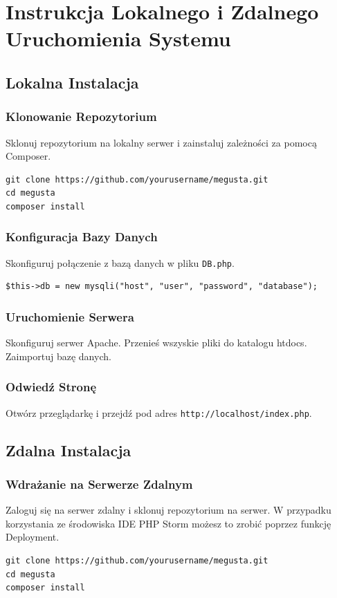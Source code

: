\documentclass[a4paper,12pt]{report}
\begin{document}
\chapter{Instrukcja Lokalnego i Zdalnego Uruchomienia Systemu}

\section{Lokalna Instalacja}

\subsection{Klonowanie Repozytorium}
Sklonuj repozytorium na lokalny serwer i zainstaluj zależności za pomocą Composer.
\begin{verbatim}
git clone https://github.com/yourusername/megusta.git
cd megusta
composer install
\end{verbatim}

\subsection{Konfiguracja Bazy Danych}
Skonfiguruj połączenie z bazą danych w pliku \texttt{DB.php}.
\begin{verbatim}
$this->db = new mysqli("host", "user", "password", "database");
\end{verbatim}

\subsection{Uruchomienie Serwera}
Skonfiguruj serwer Apache. Przenieś wszyskie pliki do katalogu htdocs. Zaimportuj bazę danych.

\subsection{Odwiedź Stronę}
Otwórz przeglądarkę i przejdź pod adres \texttt{http://localhost/index.php}.

\section{Zdalna Instalacja}

\subsection{Wdrażanie na Serwerze Zdalnym}
Zaloguj się na serwer zdalny i sklonuj repozytorium na serwer. W przypadku korzystania ze środowiska IDE PHP Storm możesz to zrobić poprzez funkcję Deployment. 
\begin{verbatim}
git clone https://github.com/yourusername/megusta.git
cd megusta
composer install
\end{verbatim}
\end{document}
